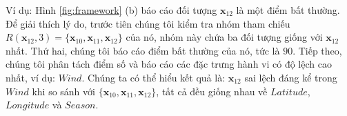 Ví dụ: Hình \ref{fig:framework} (b) báo cáo đối tượng $\mathbf{x}_{12}$ là một điểm bất thường. Để giải thích lý do, trước tiên chúng tôi kiểm tra nhóm tham chiếu $R(\mathbf{x}_{12},3)=\{\mathbf{x}_{10},\mathbf{x}_{11},\mathbf{x}_{12}\}$ của nó, nhóm này chứa ba đối tượng giống với $\mathbf{x}_{12}$ nhất. Thứ hai, chúng tôi báo cáo điểm bất thường của nó, tức là $90$. Tiếp theo, chúng tôi phân tách điểm số và báo cáo các đặc trưng hành vi có độ lệch cao nhất, ví dụ: $Wind$. Chúng ta có thể hiểu kết quả là: $\mathbf{x}_{12}$ sai lệch đáng kể trong $Wind$ khi so sánh với $\{\mathbf{x}_{10},\mathbf{x}_{11},\mathbf{x}_{12}\}$, tất cả đều giống nhau về $Latitude$, $Longitude$ và $Season$.
